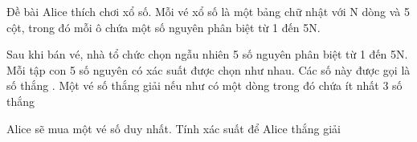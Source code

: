 Đề bài
Alice thích chơi xổ số. Mỗi vé xổ số là một bảng chữ nhật với N dòng và 5 cột, trong đó mỗi ô chứa một số nguyên phân biệt từ 1 đến 5N.  

   Sau khi bán vé, nhà tổ chức chọn ngẫu nhiên 5 số nguyên phân biệt từ 1 đến 5N. Mỗi tập con 5 số nguyên có xác suất được chọn như nhau. Các số này được gọi là   số thắng   . Một vé số thắng giải nếu như có một dòng trong đó chứa ít nhất 3   số thắng

   Alice sẽ mua một vé số duy nhất. Tính xác suất để Alice thắng giải